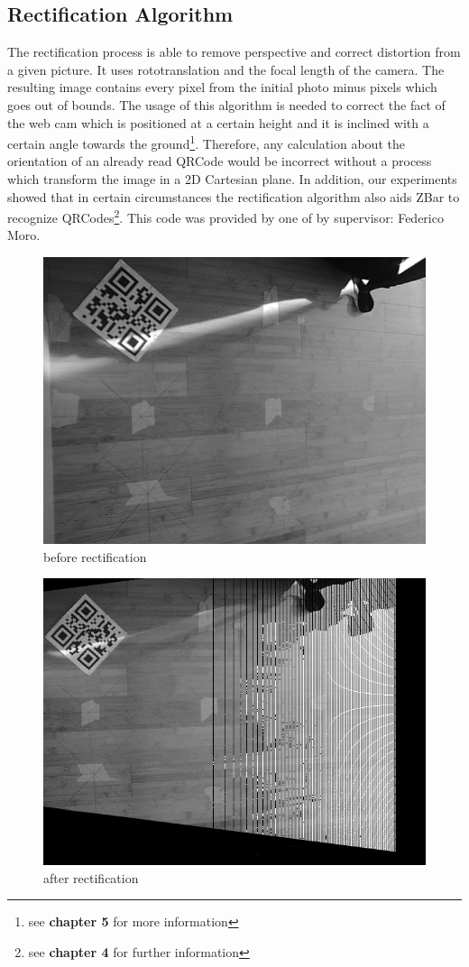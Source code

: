 \subsection{Rectification Algorithm}
The rectification process is able to remove perspective and correct distortion from a given picture.
It uses rototranslation and the focal length of the camera. The resulting image contains every pixel from the initial photo minus pixels which goes out of bounds. The usage of this algorithm is needed to correct the fact of the web cam which is positioned at a certain height and it is inclined with a certain angle towards the ground\footnote{see \textbf{chapter 5} for more information}. Therefore, any calculation about the orientation of an already read QRCode would be incorrect without a process which transform the image in a 2D Cartesian plane. In addition, our experiments showed that in certain circumstances the rectification algorithm also aids ZBar to recognize QRCodes\footnote{see \textbf{chapter 4}  for further information}. This code was provided by one of by supervisor: Federico Moro. 
\vspace{1.25cm}
\begin{figure}[hbt]
    \centering
    \includegraphics[scale=0.3]{img/beforerect.png}
    \caption{before rectification}
\end{figure}
\begin{figure}[hbt]
    \centering
    \includegraphics[scale=0.3]{img/afterrect.png}
    \caption{after rectification}
\end{figure}




 
